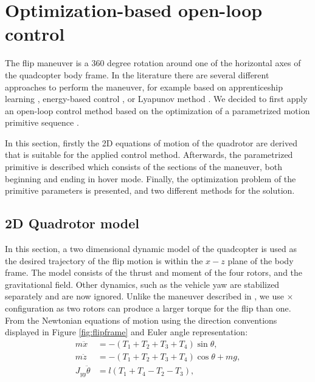\section{Optimization-based open-loop control}\label{sec:flip}
The flip maneuver is a 360 degree rotation around one of the horizontal axes of the quadcopter body frame. In the literature there are several different approaches to perform the maneuver, for example based on apprenticeship learning \cite{abbeel2010}, energy-based control \cite{energy-quaternion}, or Lyapunov method \cite{lyapunov-flip}. We decided to first apply an  open-loop control method based on the optimization of a parametrized motion primitive sequence \cite{LSICRA2010}.

In this section, firstly the 2D equations of motion of the quadrotor are derived that is suitable for the applied control method. Afterwards, the parametrized primitive is described which consists of the sections of the maneuver, both beginning and ending in hover mode. Finally, the optimization problem of the primitive parameters is presented, and two different methods for the solution. 

\subsection{2D Quadrotor model}

In this section, a two dimensional dynamic model of the quadcopter is used as the desired trajectory of the flip motion is within the $x-z$ plane of the body frame. The model consists of the thrust and moment of the four rotors, and the gravitational field. Other dynamics, such as the vehicle yaw are stabilized separately and are now ignored. Unlike the maneuver described in \cite{LSICRA2010}, we use $\times$ configuration as two rotors can produce a larger torque for the flip than one. From the Newtonian equations of motion using the direction conventions displayed in Figure \ref{fig:flipframe} and Euler angle representation:
\begin{align}
m\ddot{x}&=-(T_1 + T_2 + T_3 + T_4)\sin\theta,\\
m\ddot{z}&=-(T_1 + T_2 +T_3 + T_4) \cos\theta+mg,\\
J_{yy}\ddot{\theta} &= l(T_1+T_4-T_2-T_3),\label{eq:opinp1}
\end{align}

